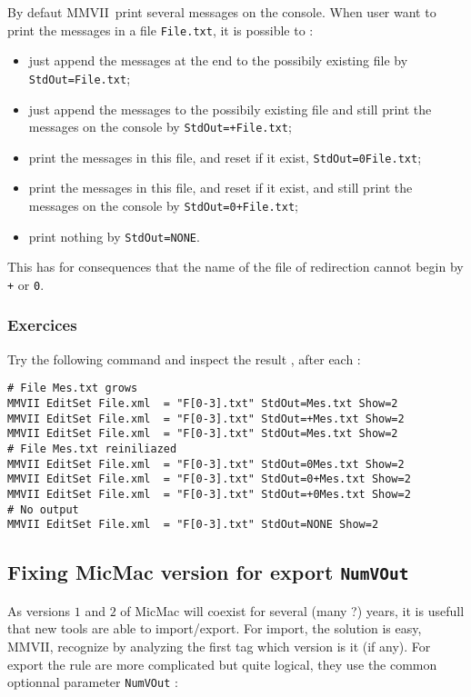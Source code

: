 \documentclass[a4paper]{book}
\newcommand{\PPP}{MMVII}
\newcommand{\MMNONE}{NONE}
\begin{document}
{By defaut \PPP\, print several messages on the console. When user want  to
print the messages in a file {\tt File.txt}, it is possible to :

\begin{itemize}
  \item just append the messages at the end to the possibily existing file  by {\tt StdOut=File.txt};
  \item just append the messages to the possibily existing file  and still print the messages on the console
        by {\tt StdOut=+File.txt};
  \item print  the messages in this file, and reset if it exist, {\tt StdOut=0File.txt};
  \item print  the messages in this file, and reset if it exist, and still print the 
       messages on the console by {\tt StdOut=0+File.txt};
  \item print  nothing by {\tt StdOut=\MMNONE}.
\end{itemize}

This has for consequences that the name of the file of redirection 
cannot begin by {\tt +} or {\tt 0}.

\subsubsection{Exercices}
Try the following command and inspect the result , after each :

\begin{verbatim}
# File Mes.txt grows
MMVII EditSet File.xml  = "F[0-3].txt" StdOut=Mes.txt Show=2
MMVII EditSet File.xml  = "F[0-3].txt" StdOut=+Mes.txt Show=2
MMVII EditSet File.xml  = "F[0-3].txt" StdOut=Mes.txt Show=2
# File Mes.txt reiniliazed
MMVII EditSet File.xml  = "F[0-3].txt" StdOut=0Mes.txt Show=2
MMVII EditSet File.xml  = "F[0-3].txt" StdOut=0+Mes.txt Show=2
MMVII EditSet File.xml  = "F[0-3].txt" StdOut=+0Mes.txt Show=2
# No output
MMVII EditSet File.xml  = "F[0-3].txt" StdOut=NONE Show=2
\end{verbatim}




\subsection{Fixing MicMac version for export {\tt NumVOut}}

As versions $1$ and $2$ of MicMac will coexist for several (many ?) years,
it is usefull that new tools are able to import/export. For import, the solution
is easy, \PPP, recognize by analyzing the first tag which version is it (if any).
For export the rule are more complicated but quite logical, they use the common
optionnal parameter {\tt NumVOut} :

}
\end{document}
